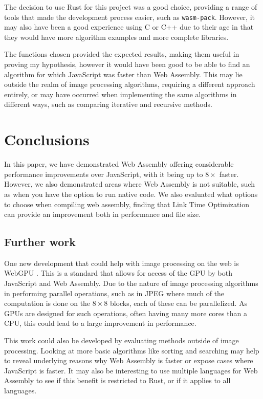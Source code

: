 \documentclass[12pt,a4paper]{article}
\begin{document}
The decision to use Rust for this project was a good choice, providing a range of tools that made the development process easier, such as \texttt{wasm-pack}. However, it may also have been a good experience using C or C++ due to their age in that they would have more algorithm examples and more complete libraries.

The functions chosen provided the expected results, making them useful in proving my hypothesis, however it would have been good to be able to find an algorithm for which JavaScript was faster than Web Assembly. This may lie outside the realm of image processing algorithms, requiring a different approach entirely, or may have occurred when implementing the same algorithms in different ways, such as comparing iterative and recursive methods.




\section{Conclusions}

In this paper, we have demonstrated Web Assembly offering considerable performance improvements over JavaScript, with it being up to $8\times$ faster. However, we also demonstrated areas where Web Assembly is not suitable, such as when you have the option to run native code. We also evaluated what options to choose when compiling web assembly, finding that Link Time Optimization can provide an improvement both in performance and file size.

\subsection{Further work}

One new development that could help with image processing on the web is WebGPU \cite{webgpu}. This is a standard that allows for access of the GPU by both JavaScript and Web Assembly. Due to the nature of image processing algorithms in performing parallel operations, such as in JPEG where much of the computation is done on the $8\times 8$ blocks, each of these can be parallelized. As GPUs are designed for such operations, often having many more cores than a CPU, this could lead to a large improvement in performance.


This work could also be developed by evaluating methods outside of image processing. Looking at more basic algorithms like sorting and searching may help to reveal underlying reasons why Web Assembly is faster or expose cases where JavaScript is faster.
It may also be interesting to use multiple languages for Web Assembly to see if this benefit is restricted to Rust, or if it applies to all languages.



\newpage

\end{document}

